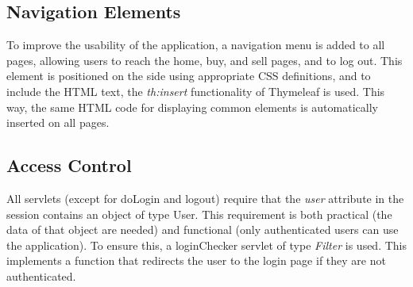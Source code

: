 \documentclass[12pt, a4paper, renqo, final]{amsart}
\begin{document}
		\subsection{Navigation Elements}
			To improve the usability of the application, a navigation menu is added to all pages, allowing users to reach the home, buy, and sell pages, and to log out. This element is positioned on the side using appropriate CSS definitions, and to include the HTML text, the \textit{th:insert} functionality of Thymeleaf is used. This way, the same HTML code for displaying common elements is automatically inserted on all pages.
			\begin{figure}[h]
				\noindent {}
			\end{figure}
			\phantom{.}
		\subsection{Access Control}
			All servlets (except for doLogin and logout) require that the \textit{user} attribute in the session contains an object of type User. This requirement is both practical (the data of that object are needed) and functional (only authenticated users can use the application). To ensure this, a loginChecker servlet of type \textit{Filter} is used. This implements a function that redirects the user to the login page if they are not authenticated.
\end{document}
